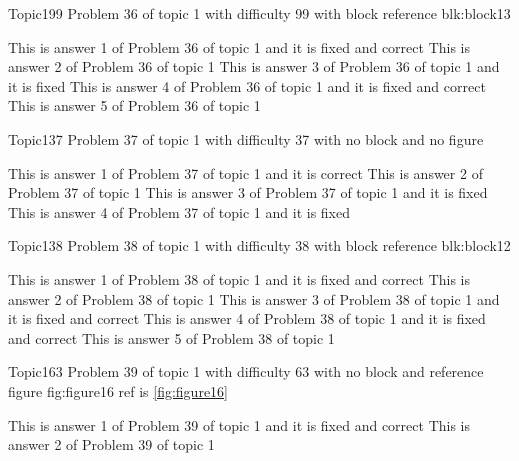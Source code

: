 \documentclass[master]{exam}
\begin{document}
\begin{problem}[requires=blk:block13]{Topic1}{99}
	Problem 36 of topic 1 with difficulty 99 with block reference blk:block13
	\begin{answers}
		 This is answer 1 of Problem 36 of topic 1 and it is fixed and correct
		\answer This is answer 2 of Problem 36 of topic 1 
		\answer[fixed] This is answer 3 of Problem 36 of topic 1 and it is fixed
		 This is answer 4 of Problem 36 of topic 1 and it is fixed and correct
		\answer This is answer 5 of Problem 36 of topic 1 
	\end{answers}
\end{problem}

\begin{problem}{Topic1}{37}
	Problem 37 of topic 1 with difficulty 37 with no block and no figure
	\begin{answers}
		\answer[correct] This is answer 1 of Problem 37 of topic 1 and it is correct
		\answer This is answer 2 of Problem 37 of topic 1 
		\answer[fixed] This is answer 3 of Problem 37 of topic 1 and it is fixed
		\answer[fixed] This is answer 4 of Problem 37 of topic 1 and it is fixed
	\end{answers}
\end{problem}

\begin{problem}[requires=blk:block12]{Topic1}{38}
	Problem 38 of topic 1 with difficulty 38 with block reference blk:block12
	\begin{answers}
		 This is answer 1 of Problem 38 of topic 1 and it is fixed and correct
		\answer This is answer 2 of Problem 38 of topic 1 
		 This is answer 3 of Problem 38 of topic 1 and it is fixed and correct
		 This is answer 4 of Problem 38 of topic 1 and it is fixed and correct
		\answer This is answer 5 of Problem 38 of topic 1 
	\end{answers}
\end{problem}

\begin{problem}{Topic1}{63}
	Problem 39 of topic 1 with difficulty 63 with no block and reference figure fig:figure16 ref is \ref{fig:figure16}
	\begin{answers}
		 This is answer 1 of Problem 39 of topic 1 and it is fixed and correct
		\answer This is answer 2 of Problem 39 of topic 1 
	\end{answers}
\end{problem}
\end{document}
